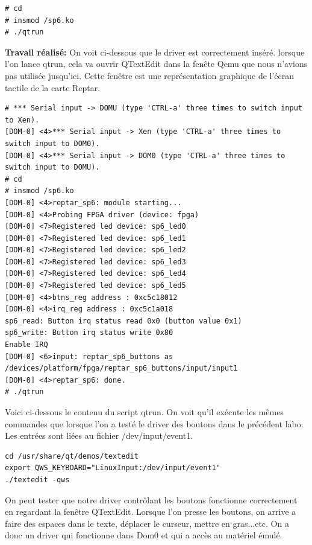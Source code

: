 \begin{lstlisting}
# cd
# insmod /sp6.ko
# ./qtrun
\end{lstlisting}
\textbf{Travail réalisé: }On voit ci-dessous que le driver est correctement inséré. lorsque l'on lance qtrun, cela va ouvrir QTextEdit dans la fenête Qemu que nous n'avions pas utilisée jusqu'ici. Cette fenêtre est une représentation graphique de l'écran tactile de la carte Reptar.
\begin{lstlisting}
# *** Serial input -> DOMU (type 'CTRL-a' three times to switch input to Xen).
[DOM-0] <4>*** Serial input -> Xen (type 'CTRL-a' three times to switch input to DOM0).
[DOM-0] <4>*** Serial input -> DOM0 (type 'CTRL-a' three times to switch input to DOMU).
# cd
# insmod /sp6.ko 
[DOM-0] <4>reptar_sp6: module starting...
[DOM-0] <4>Probing FPGA driver (device: fpga)
[DOM-0] <7>Registered led device: sp6_led0
[DOM-0] <7>Registered led device: sp6_led1
[DOM-0] <7>Registered led device: sp6_led2
[DOM-0] <7>Registered led device: sp6_led3
[DOM-0] <7>Registered led device: sp6_led4
[DOM-0] <7>Registered led device: sp6_led5
[DOM-0] <4>btns_reg address : 0xc5c18012
[DOM-0] <4>irq_reg address : 0xc5c1a018
sp6_read: Button irq status read 0x0 (button value 0x1)
sp6_write: Button irq status write 0x80
Enable IRQ
[DOM-0] <6>input: reptar_sp6_buttons as /devices/platform/fpga/reptar_sp6_buttons/input/input1
[DOM-0] <4>reptar_sp6: done.
# ./qtrun
\end{lstlisting}
Voici ci-dessous le contenu du script qtrun. On voit qu'il exécute les mêmes commandes que lorsque l'on a testé le driver des boutons dans le précédent labo. Les entrées sont liées au fichier /dev/input/event1.
\begin{lstlisting}
cd /usr/share/qt/demos/textedit
export QWS_KEYBOARD="LinuxInput:/dev/input/event1"
./textedit -qws
\end{lstlisting}
On peut tester que notre driver contrôlant les boutons fonctionne correctement en regardant la fenêtre QTextEdit. Lorsque l'on presse les boutons, on arrive a faire des espaces dans le texte, déplacer le curseur, mettre en gras...etc. On a donc un driver qui fonctionne dans Dom0 et qui a accès au matériel émulé.
